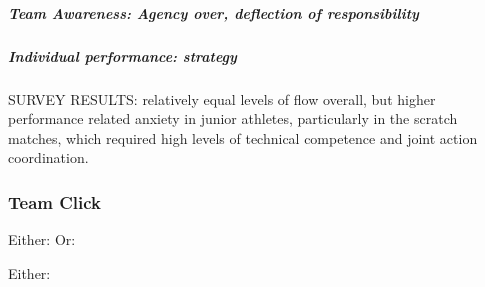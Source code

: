 
          \subparagraph{Team Awareness: Agency over, deflection of responsibility}
        \subparagraph{Individual performance: strategy}



      SURVEY RESULTS: relatively equal levels of flow overall, but higher performance related anxiety in junior athletes, particularly in the scratch matches, which required high levels of technical competence and joint action coordination.







      \subsubsection{Team Click}

Either:
Or:


Either:

